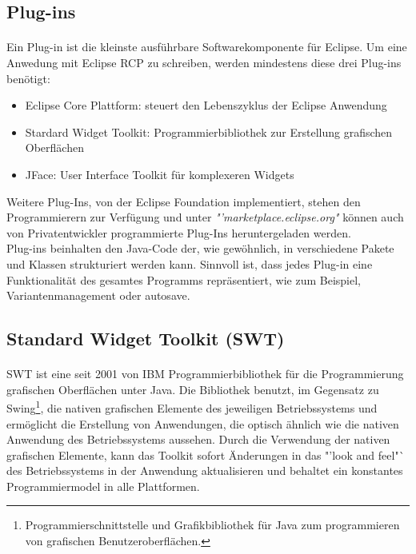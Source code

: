 \subsection{Plug-ins}
\paragraph{}
Ein Plug-in ist die kleinste ausführbare Softwarekomponente für Eclipse. Um eine Anwedung mit Eclipse RCP zu schreiben, werden mindestens diese drei Plug-ins benötigt:
\begin{itemize}
\item Eclipse Core Plattform: steuert den Lebenszyklus der Eclipse Anwendung
\item Stardard Widget Toolkit: Programmierbibliothek zur Erstellung grafischen Oberflächen
\item JFace: User Interface Toolkit für komplexeren Widgets
\end{itemize}

Weitere Plug-Ins, von der Eclipse Foundation implementiert, stehen den Programmierern zur Verfügung und unter \textit{"'marketplace.eclipse.org"} können auch von Privatentwickler programmierte Plug-Ins heruntergeladen werden. \cite{Eclipse}\\

Plug-ins beinhalten den Java-Code der, wie gewöhnlich, in verschiedene Pakete und Klassen strukturiert werden kann. Sinnvoll ist, dass jedes Plug-in eine Funktionalität des gesamtes Programms repräsentiert, wie zum Beispiel, Variantenmanagement oder autosave.

\subsection{Standard Widget Toolkit (SWT)}
\paragraph{}
SWT ist eine seit 2001 von IBM Programmierbibliothek für die Programmierung grafischen Oberflächen unter Java. Die Bibliothek benutzt, im Gegensatz zu Swing\footnote{Programmierschnittstelle und Grafikbibliothek für Java zum programmieren von grafischen Benutzeroberflächen.}, die nativen grafischen Elemente des jeweiligen Betriebssystems und ermöglicht die Erstellung von Anwendungen, die optisch ähnlich wie die nativen Anwendung des Betriebssystems aussehen. Durch die Verwendung der nativen grafischen Elemente, kann das Toolkit sofort Änderungen in das "'look and feel"` des Betriebssystems in der Anwendung aktualisieren und behaltet ein konstantes Programmiermodel in alle Plattformen.
\cite{EclipseSWT}\\

